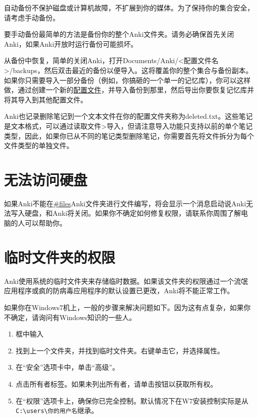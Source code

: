 \documentclass[a4paper]{book}
\begin{document}
		自动备份不保护磁盘或计算机故障，不扩展到你的媒体。为了保持你的集合安全，请考虑手动备份。
		
		要手动备份最简单的方法是备份你的整个Anki文件夹。请务必确保首先关闭Anki，如果Anki开放时运行备份可能损坏。
		
		从备份中恢复，简单的关闭Anki，打开Documents/Anki/<配置文件名>/backups，然后双击最近的备份以便导入。这将覆盖你的整个集合与备份副本。如果你只需要导入一部分备份（例如，你搞砸的一个单一的记忆库），你可以这样做，通过创建一个新的\hyperref[profiles]{配置文件}，并导入备份到那里，然后导出你要恢复记忆库并将其导入到其他配置文件。
		
		Anki也记录删除笔记到一个文本文件在你的配置文件夹称为deleted.txt。这些笔记是文本格式，可以通过读取文件>导入，但请注意导入功能只支持以前的单个笔记类型，因此，如果你已从不同的笔记类型删除笔记，你需要首先将文件拆分为每个文件类型的单独文件。
		
		\section{无法访问硬盘}
		
		如果Anki不能在\url{#files}Anki文件夹进行文件编写，将会显示一个消息启动说Anki无法写入硬盘，和Anki将关闭。如果你不确定如何修复权限，请联系你周围了解电脑的人可以帮助你。
		
		\section{临时文件夹的权限}
		
		Anki使用系统的临时文件夹来存储临时数据。如果该文件夹的权限通过一个流氓应用程序或疯的防病毒应用程序的默认设置已更改，Anki将不能正常工作。
		
		如果你在Windows7机上，一般的步骤来解决问题如下。因为这有点复杂，如果你不确定，请询问有Windows知识的一些人。
		
		\begin{enumerate}
			\itemsep1pt\parskip0pt
			\item 框中输入%
			\item 找到上一个文件夹，并找到临时文件夹。右键单击它，并选择属性。
			\item 在“安全”选项卡中，单击“高级”。
			\item 点击所有者标签。如果未列出所有者，请单击按钮以获取所有权。
			\item 在“权限”选项卡上，确保你已完全控制。默认情况下在W7安装控制实际是从\verb|C:\users\你的用户名|继承。
		\end{enumerate}
		
\end{document}
